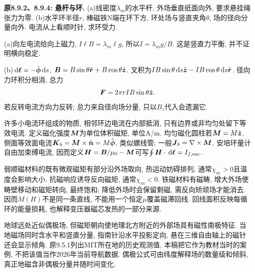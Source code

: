 \begin{example}
\textbf{原8.9.2、8.9.4: 悬杆与环.} 
(a)线密度$\lambda_m$的水平杆, 外场垂直纸面向外, 要求悬挂绳张力为零. (b)水平环半径$r$, 棒磁铁N端在环下方, 环处场与竖直夹角$\theta$, 场的径向分量向外. 电流从上看顺时针, 求环受力.
\end{example}
\begin{solution}
(a)向左电流给向上磁力, $I\ell B=\lambda_m\ell g$, 所以$I=\lambda_mg/B$. 这是竖直力平衡, 并不证明横向稳定.

(b)$\,\mathrm d\boldsymbol{\ell}=-\hat{\boldsymbol{\phi}}\,\mathrm d s$, $\boldsymbol{B}=B\sin\theta\hat{\boldsymbol{r}}+B\cos\theta\hat{\boldsymbol{z}}$. 叉积为$I B\sin\theta\,\mathrm d s\hat{\boldsymbol{z}}-I B\cos\theta\,\mathrm d s\hat{\boldsymbol{r}}$. 径向力环积分相消, 总力
\[\boldsymbol{F}=2\pi rIB\sin\theta\hat{\boldsymbol{z}}.\]
若反转电流方向力反转; 总力来自径向场分量, 只以$B_z$代入会遗漏它.
\end{solution}

\label{tb:magnetization}
许多小电流环组成的物质, 相邻环边电流在内部抵消, 只有边界或非均匀处留下等效电流. 定义磁化强度$\boldsymbol{M}$为单位体积磁矩, 单位A/m. 均匀磁化圆柱若$\boldsymbol{M}=M\hat{\boldsymbol{z}}$, 侧面等效面电流$\boldsymbol{K}_b=\boldsymbol{M}\times\hat{\boldsymbol{n}}=M\hat{\boldsymbol{\phi}}$, 类似螺线管; 一般$\boldsymbol{J}_b=\nabla\times\boldsymbol{M}$. 安培环量计自由加束缚电流, 因而定义$\boldsymbol{H}=\boldsymbol{B}/\mu_0-\boldsymbol{M}$可写$\oint\boldsymbol{H}\cdot\,\mathrm d\boldsymbol{\ell}=I_{f,\rm enc}$.

弱顺磁材料的既有微观磁矩有部分沿外场取向, 热运动妨碍排列, 通常$\chi_m>0$且温度会影响大小. 抗磁响应诱导反向磁矩, 通常$\chi_m<0$. 铁磁材料有磁畴, 增大外场使畴壁移动和磁矩转向, 最终饱和; 降低外场时会保留剩磁, 需反向矫顽场才能消去. 因而$M(H)$不是同一条直线, 不能用一个恒定$\mu$覆盖磁滞回线. 回线面积反映每循环的能量损耗, 也解释变压器磁芯发热的一部分来源.

地球远处近似偶极场, 但磁矩朝向使地理北方附近的外部场具有磁性南极特征. 当地磁场同时含水平和竖直分量, 指南针沿水平投影定向, 悬在三维自由轴上的磁针还会显示倾角. 原9.5.1列出MIT所在地的历史观测值, 本稿把它作为教材当时的案例, 不把该值当作2026年当前导航数据. 偶极公式可由纬度解释场的数量级和倾斜, 真正地磁含非偶极分量并随时间变化.
